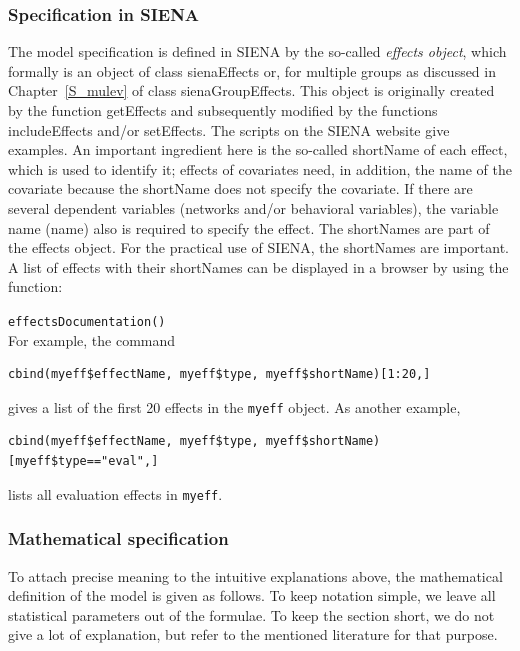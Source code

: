 \documentclass[a4paper,fleqn,11pt]{article}
\newcommand{\+}{\, + \,}
\newcommand{\sfn}[1]{\textsf{#1}}
\newcommand{\SI}{{\sf SIENA }}
\newcommand{\si}{{\sf SIENA}}
\begin{document}
\subsubsection{Specification in \SI}

The model specification is defined in \SI by the so-called
\emph{effects object}, which formally is an object of class
\sfn{sienaEffects} or, for multiple groups as discussed in Chapter~\ref{S_mulev}
of class \sfn{sienaGroupEffects}.
This object is originally created by the function \sfn{getEffects} and
subsequently modified by the functions \sfn{includeEffects} and/or
\sfn{setEffects}.
The scripts on the \SI website give examples.
An important ingredient here is the so-called \sfn{shortName}
of each effect, which is used to identify it;
effects of covariates need, in addition, the name of the covariate
because the \sfn{shortName} does not specify the covariate.
If there are several dependent variables (networks and/or behavioral variables),
the variable name (\sfn{name}) also is required to specify the effect.
The \sfn{shortName}s are part of the effects object.
For the practical use of \si, the \sfn{shortName}s are important.
A list of effects with their \sfn{shortName}s can be displayed in a browser
by using the function:

\verb|effectsDocumentation()| \\

For example, the command
\begin{verbatim}
cbind(myeff$effectName, myeff$type, myeff$shortName)[1:20,]
\end{verbatim}
gives a list of the first 20 effects in the \texttt{myeff} object.
As another example,
\begin{verbatim}
cbind(myeff$effectName, myeff$type, myeff$shortName)[myeff$type=="eval",]
\end{verbatim}
lists all evaluation effects in \texttt{myeff}.


\subsubsection{Mathematical specification}
\label{S_mathmod}

To attach precise meaning to the intuitive explanations above,
the mathematical definition of the model is given as follows.
To keep notation simple, we leave all statistical parameters out of the
formulae. To keep the section short, we do not give a lot of explanation,
but refer to the mentioned literature for that purpose.
\end{document}
